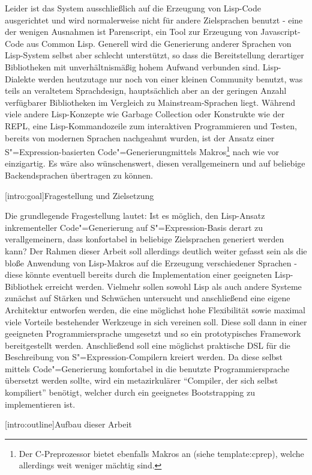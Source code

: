 \documentclass[11pt, a4paper, bibgerm]{scrbook}
\newcommand\lsection{}
\newcommand\sref{}
\newcommand{\sees}[1]{(siehe \sref{#1})}
\newcommand{\sexp}{S"=Expression}
\newcommand{\cgen}{Code"=Generierung}
\begin{document}
Leider ist das System ausschließlich auf die Erzeugung von Lisp-Code
ausgerichtet und wird normalerweise nicht für andere Zielsprachen
benutzt - eine der wenigen Ausnahmen ist Parenscript\cite{Parenscript},
ein Tool zur Erzeugung von Javascript-Code aus Common Lisp. Generell
wird die Generierung anderer Sprachen von Lisp-System selbst aber
schlecht unterstützt, so dass die Bereitstellung derartiger Bibliotheken
mit unverhältnismäßig hohem Aufwand verbunden sind. Lisp-Dialekte werden
heutzutage nur noch von einer kleinen Community benutzt, was teils an
veraltetem Sprachdesign, hauptsächlich aber an der geringen Anzahl
verfügbarer Bibliotheken im Vergleich zu Mainstream-Sprachen
liegt. Während viele andere Lisp-Konzepte wie Garbage Collection oder
Konstrukte wie der REPL, eine Lisp-Kommandozeile zum interaktiven
Programmieren und Testen, bereits von modernen Sprachen nachgeahmt
wurden, ist der Ansatz einer \sexp-basierten \cgen mittels
Makros\footnote{Der C-Preprozessor bietet ebenfalls Makros an
  \sees{template:cprep}, welche allerdings weit weniger mächtig sind.}
nach wie vor einzigartig. Es wäre also wünschenswert, diesen
verallgemeinern und auf beliebige Backendsprachen übertragen zu können.

\lsection[intro:goal]{Fragestellung und Zielsetzung}

Die grundlegende Fragestellung lautet: Ist es möglich, den Lisp-Ansatz
inkrementeller \cgen{} auf \sexp{}-Basis derart zu verallgemeinern, dass
konfortabel in beliebige Zielsprachen generiert werden kann? Der Rahmen
dieser Arbeit soll allerdings deutlich weiter gefasst sein als die bloße
Anwendung von Lisp-Makros auf die Erzeugung verschiedener Sprachen -
diese könnte eventuell bereits durch die Implementation einer geeigneten
Lisp-Bibliothek erreicht werden. Vielmehr sollen sowohl Lisp als auch
andere Systeme zunächst auf Stärken und Schwächen untersucht und
anschließend eine eigene Architektur entworfen werden, die eine
möglichst hohe Flexibilität sowie maximal viele Vorteile bestehender
Werkzeuge in sich vereinen soll. Diese soll dann in einer geeigneten
Programmiersprache umgesetzt und so ein prototypisches Framework
bereitgestellt werden. Anschließend soll eine möglichst praktische DSL
für die Beschreibung von \sexp{}-Compilern kreiert werden. Da diese
selbst mittels \cgen{} komfortabel in die benutzte Programmiersprache
übersetzt werden sollte, wird ein metazirkulärer "`Compiler, der sich
selbst kompiliert"' benötigt, welcher durch ein geeignetes Bootstrapping
zu implementieren ist.

\lsection[intro:outline]{Aufbau dieser Arbeit}
\end{document}
